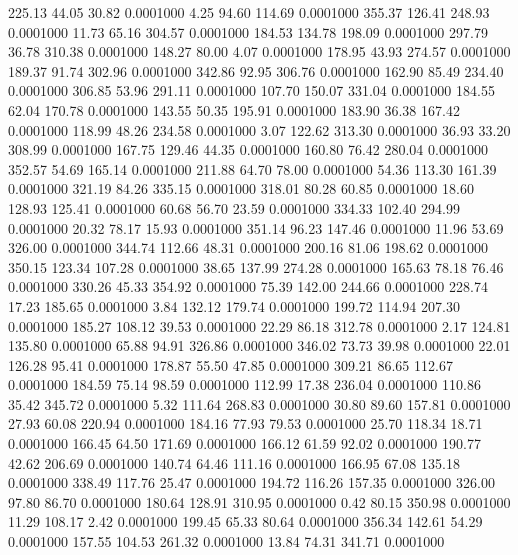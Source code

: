  225.13   44.05   30.82   0.0001000
   4.25   94.60  114.69   0.0001000
 355.37  126.41  248.93   0.0001000
  11.73   65.16  304.57   0.0001000
 184.53  134.78  198.09   0.0001000
 297.79   36.78  310.38   0.0001000
 148.27   80.00    4.07   0.0001000
 178.95   43.93  274.57   0.0001000
 189.37   91.74  302.96   0.0001000
 342.86   92.95  306.76   0.0001000
 162.90   85.49  234.40   0.0001000
 306.85   53.96  291.11   0.0001000
 107.70  150.07  331.04   0.0001000
 184.55   62.04  170.78   0.0001000
 143.55   50.35  195.91   0.0001000
 183.90   36.38  167.42   0.0001000
 118.99   48.26  234.58   0.0001000
   3.07  122.62  313.30   0.0001000
  36.93   33.20  308.99   0.0001000
 167.75  129.46   44.35   0.0001000
 160.80   76.42  280.04   0.0001000
 352.57   54.69  165.14   0.0001000
 211.88   64.70   78.00   0.0001000
  54.36  113.30  161.39   0.0001000
 321.19   84.26  335.15   0.0001000
 318.01   80.28   60.85   0.0001000
  18.60  128.93  125.41   0.0001000
  60.68   56.70   23.59   0.0001000
 334.33  102.40  294.99   0.0001000
  20.32   78.17   15.93   0.0001000
 351.14   96.23  147.46   0.0001000
  11.96   53.69  326.00   0.0001000
 344.74  112.66   48.31   0.0001000
 200.16   81.06  198.62   0.0001000
 350.15  123.34  107.28   0.0001000
  38.65  137.99  274.28   0.0001000
 165.63   78.18   76.46   0.0001000
 330.26   45.33  354.92   0.0001000
  75.39  142.00  244.66   0.0001000
 228.74   17.23  185.65   0.0001000
   3.84  132.12  179.74   0.0001000
 199.72  114.94  207.30   0.0001000
 185.27  108.12   39.53   0.0001000
  22.29   86.18  312.78   0.0001000
   2.17  124.81  135.80   0.0001000
  65.88   94.91  326.86   0.0001000
 346.02   73.73   39.98   0.0001000
  22.01  126.28   95.41   0.0001000
 178.87   55.50   47.85   0.0001000
 309.21   86.65  112.67   0.0001000
 184.59   75.14   98.59   0.0001000
 112.99   17.38  236.04   0.0001000
 110.86   35.42  345.72   0.0001000
   5.32  111.64  268.83   0.0001000
  30.80   89.60  157.81   0.0001000
  27.93   60.08  220.94   0.0001000
 184.16   77.93   79.53   0.0001000
  25.70  118.34   18.71   0.0001000
 166.45   64.50  171.69   0.0001000
 166.12   61.59   92.02   0.0001000
 190.77   42.62  206.69   0.0001000
 140.74   64.46  111.16   0.0001000
 166.95   67.08  135.18   0.0001000
 338.49  117.76   25.47   0.0001000
 194.72  116.26  157.35   0.0001000
 326.00   97.80   86.70   0.0001000
 180.64  128.91  310.95   0.0001000
   0.42   80.15  350.98   0.0001000
  11.29  108.17    2.42   0.0001000
 199.45   65.33   80.64   0.0001000
 356.34  142.61   54.29   0.0001000
 157.55  104.53  261.32   0.0001000
  13.84   74.31  341.71   0.0001000
